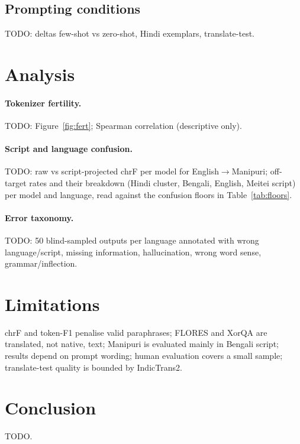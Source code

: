 \documentclass[11pt]{article}
\begin{document}
\subsection{Prompting conditions}
TODO: deltas few-shot vs zero-shot, Hindi exemplars, translate-test.

\section{Analysis}
\paragraph{Tokenizer fertility.} TODO: Figure~\ref{fig:fert}; Spearman correlation (descriptive only).
\paragraph{Script and language confusion.} TODO: raw vs script-projected chrF per model for
English$\rightarrow$Manipuri; off-target rates and their breakdown (Hindi cluster, Bengali, English,
Meitei script) per model and language, read against the confusion floors in Table~\ref{tab:floors}.
\paragraph{Error taxonomy.} TODO: 50 blind-sampled outputs per language annotated with
wrong language/script, missing information, hallucination, wrong word sense, grammar/inflection.


\section{Limitations}
chrF and token-F1 penalise valid paraphrases; FLORES and XorQA are translated, not native, text;
Manipuri is evaluated mainly in Bengali script; results depend on prompt wording; human evaluation
covers a small sample; translate-test quality is bounded by IndicTrans2.

\section{Conclusion}
TODO.



\end{document}
